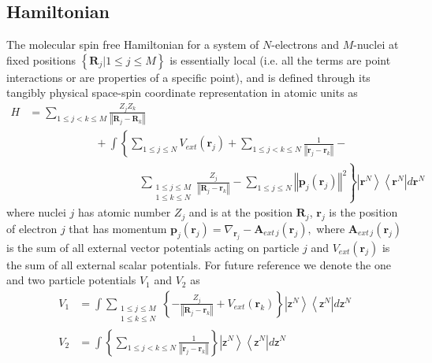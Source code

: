 \documentclass[aps,preprint]{revtex4}%
\begin{document}
\subsection{Hamiltonian}

The molecular spin free Hamiltonian for a system of $N$-electrons and
$M$-nuclei at fixed positions $\left\{  \mathbf{R}_{j}|1\leq j\leq M\right\}
$ is essentially local (i.e. all the terms are point interactions or are
properties of a specific point), and is defined through its tangibly physical
space-spin coordinate representation in atomic units as%
\begin{align}
H  &  =\sum_{1\leq j<k\leq M}\frac{Z_{j}Z_{k}}{\left\Vert \mathbf{R}%
_{j}-\mathbf{R}_{k}\right\Vert }\nonumber\\
&  \qquad\qquad\qquad+\int\left\{  \sum_{1\leq j\leq N}V_{ext}\left(
\mathbf{r}_{j}\right)  +\sum_{1\leq j<k\leq N}\frac{1}{\left\Vert
\mathbf{r}_{j}-\mathbf{r}_{k}\right\Vert }-\right. \nonumber\\
&  \qquad\qquad\qquad\qquad\qquad\left.  \sum_{\substack{1\leq j\leq M\\1\leq
k\leq N}}\frac{Z_{j}}{\left\Vert \mathbf{R}_{j}-\mathbf{r}_{k}\right\Vert
}-\sum_{1\leq j\leq N}\left\Vert \mathbf{p}_{j}\left(  \mathbf{r}_{j}\right)
\right\Vert ^{2}\right\}  \left\vert \mathbf{r}^{N}\right\rangle \left\langle
\mathbf{r}^{N}\right\vert d\mathbf{r}^{N} \label{hamilt1}%
\end{align}
where nuclei $j$ has atomic number $Z_{j}$ and is at the position
$\mathbf{R}_{j}$, $\mathbf{r}_{j}$ is the position of electron $j$ that has
momentum $\mathbf{p}_{j}\left(  \mathbf{r}_{j}\right)  =\nabla_{\mathbf{r}%
_{j}}-\mathbf{A}_{ext\,j}\left(  \mathbf{r}_{j}\right)  ,$ where
$\mathbf{A}_{ext\,j}\left(  \mathbf{r}_{j}\right)  $ is the sum of all
external vector potentials acting on particle $j$ and $V_{ext}\left(
\mathbf{r}_{j}\right)  $ is the sum of all external scalar potentials. For
future reference we denote the one and two particle potentials $V_{1}$ and
$V_{2}$ as
\begin{align}
V_{1}  &  =%
{\displaystyle\int}
\sum\limits_{\substack{1\leq j\leq M\\1\leq k\leq N}}\left\{  -\frac{Z_{j}%
}{\left\Vert \mathbf{R}_{j}-\mathbf{r}_{k}\right\Vert }+V_{ext}\left(
\mathbf{r}_{k}\right)  \right\}  \left\vert \mathsf{z}^{N}\right\rangle
\left\langle \mathsf{z}^{N}\right\vert d\mathsf{z}^{N}\nonumber\\
V_{2}  &  =%
{\displaystyle\int}
\left\{  \sum\limits_{1\leq j<k\leq N}\frac{1}{\left\Vert \mathbf{r}%
_{j}-\mathbf{r}_{k}\right\Vert }\right\}  \left\vert \mathsf{z}^{N}%
\right\rangle \left\langle \mathsf{z}^{N}\right\vert d\mathsf{z}^{N}%
\end{align}
\end{document}
